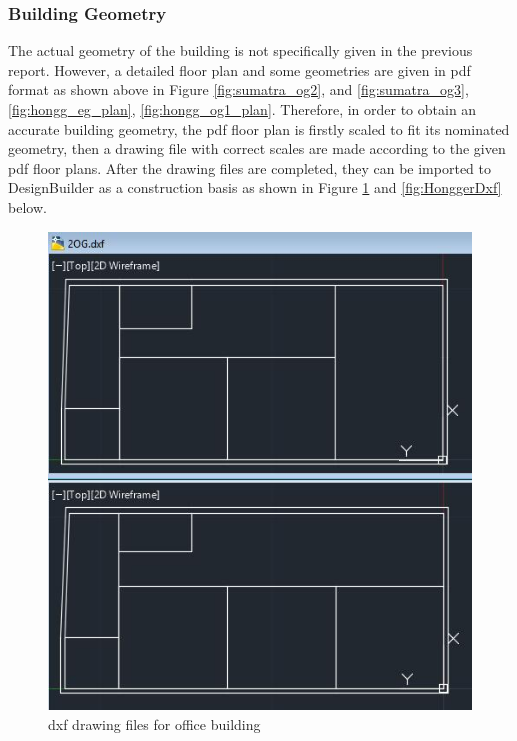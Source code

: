 \documentclass[11pt, a4paper]{article}
\theoremstyle{definition}
\begin{document}
		\subsubsection{Building Geometry}
			The actual geometry of the building is not specifically given in the previous report. However, a detailed floor plan and some geometries are given in pdf format as shown above in Figure \ref{fig:sumatra_og2}, and \ref{fig:sumatra_og3}, \ref{fig:hongg_eg_plan}, \ref{fig:hongg_og1_plan}. Therefore, in order to obtain an accurate building geometry, the pdf floor plan is firstly scaled to fit its nominated geometry, then a drawing file with correct scales are made according to the given pdf floor plans. After the drawing files are completed, they can be imported to DesignBuilder as a construction basis as shown in Figure \ref{fig:SumatraDxf} and \ref{fig:HonggerDxf} below.

			\begin{figure}[H]
			\centering
			\includegraphics[scale=0.7]{Sumatra_dxf.jpg}
			\caption{dxf drawing files for office building}
			\label{fig:SumatraDxf}
			\end{figure}
			
\end{document}
